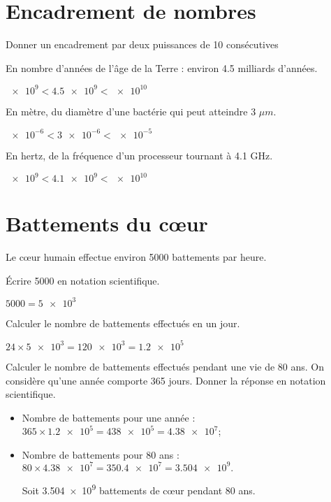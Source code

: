 \documentclass[a4paper,11pt]{exam}
\begin{document}
\newpage	
\section{Encadrement de nombres}

Donner un encadrement par deux puissances de 10 consécutives 

	\begin{questions}
		\question En nombre d'années de l'âge de la Terre : environ \num{4.5} milliards d'années.
		\begin{solution}
			$\num{e9}<\num{4.5e9}<\num{e10}$
		\end{solution}
		
		
		\question En mètre, du diamètre d'une bactérie qui peut atteindre \num{3} $\mu m$.
		\begin{solution}
			$\num{e-6}<\num{3e-6}<\num{e-5}$
			\end{solution}
		

		\question En hertz, de la fréquence d'un processeur tournant à \num{4.1} GHz.
		\begin{solution}
			$\num{e9}<\num{4.1e9}<\num{e10}$
		\end{solution}
	\end{questions}
	
\section{Battements du c\oe ur}	

Le c\oe ur humain effectue environ \num{5000} battements par heure.

	\begin{questions}
		\question \'Ecrire \num{5000} en notation scientifique.
		\begin{solution}
			$\num{5000} = \num{5e3}$
		\end{solution}
		
		\question Calculer le nombre de battements effectués en un jour.
		\begin{solution}
			$ 24 \times \num{5e3} = \num{120e3} = \num{1.2e5}$
		\end{solution}
		
		\question Calculer le nombre de battements effectués pendant une vie de 80 ans. On considère qu'une année comporte 365 jours. Donner la réponse en notation scientifique.
		\begin{solution}
			\begin{itemize}
				\item Nombre de battements pour une année : $365 \times \num{1.2e5} = \num{438e5} = \num{4.38e7}$;
				\item Nombre de battements pour 80 ans : $80 \times \num{4.38e7} = \num{350.4e7} = \num{3.504e9}.$
				
				Soit \num{3.504e9} battements de c\oe ur pendant 80 ans.
			\end{itemize}
		\end{solution}
	\end{questions}
	
\end{document}
